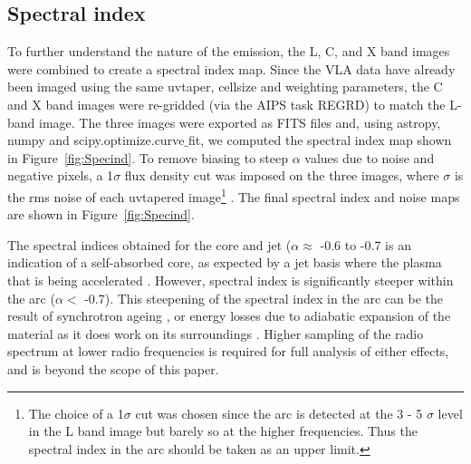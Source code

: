 \documentclass[fleqn,usenatbib]{mnras}
\def\fig{Figure}
\begin{document}
\subsection{Spectral index}

To further understand the nature of the emission, the L,  C, and X band images were combined to create a spectral index map. Since the VLA data have already been imaged using the same uvtaper, cellsize and weighting parameters, the C and X band images were re-gridded (via the AIPS task REGRD) to match the L-band image. The three images were 
exported as FITS files and, using astropy, numpy and scipy.optimize.curve$\_$fit, we computed the spectral index map shown in \fig~\ref{fig:Specind}. To remove biasing to steep $\alpha$ 
values due to noise and negative pixels, a 1$\sigma$ flux density cut was imposed on the three images, where $\sigma$ is the rms noise of each uvtapered image\footnote{The choice of a 1$
\sigma$ cut was chosen since the arc is detected at the 3 - 5 $\sigma$ level in the L band image but barely so at the higher frequencies. Thus the spectral index in the arc should be taken as an 
upper limit.} . The final spectral index and noise maps are shown in \fig~\ref{fig:Specind}. 

{The spectral indices obtained for the core and jet ($\alpha \approx$ -0.6 to -0.7 is an indication of a self-absorbed core, as expected by a jet basis where the plasma that is being accelerated \citep{NWF01}. However, spectral index is significantly steeper within the arc ($\alpha <$ -0.7). This steepening of the spectral index in the arc can be the result of synchrotron ageing \citep{CPDL91}, or energy losses due to adiabatic expansion of the material as it does work on its surroundings \citep{CPDL91}. Higher sampling of the radio spectrum at lower radio frequencies is required for full analysis of either effects, and is beyond the scope of this paper.}
\end{document}
